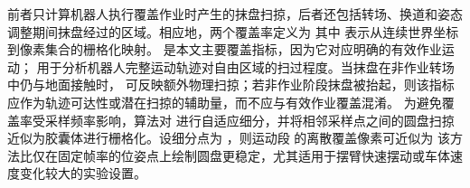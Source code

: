 {}前者只计算机器人执行覆盖作业时产生的抹盘扫掠，后者还包括转场、换道和姿态调整期间抹盘经过的区域。相应地，两个覆盖率定义为\markdownRendererParagraphSeparator
{}\markdownRendererParagraphSeparator
{}其中  表示从连续世界坐标到像素集合的栅格化映射。 是本文主要覆盖指标，因为它对应明确的有效作业运动； 用于分析机器人完整运动轨迹对自由区域的扫过程度。当抹盘在非作业转场中仍与地面接触时， 可反映额外物理扫掠；若非作业阶段抹盘被抬起，则该指标应作为轨迹可达性或潜在扫掠的辅助量，而不应与有效作业覆盖混淆。\markdownRendererParagraphSeparator
{}为避免覆盖率受采样频率影响，算法对  进行自适应细分，并将相邻采样点之间的圆盘扫掠近似为胶囊体进行栅格化。设细分点为 ，则运动段  的离散覆盖像素可近似为\markdownRendererParagraphSeparator
{}\markdownRendererParagraphSeparator
{}该方法比仅在固定帧率的位姿点上绘制圆盘更稳定，尤其适用于摆臂快速摆动或车体速度变化较大的实验设置。
\markdownRendererSectionEnd 
\markdownRendererSectionEnd \markdownRendererDocumentEnd